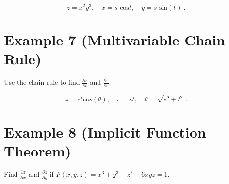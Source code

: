 \documentclass[11pt]{article}
\begin{document}
$$z = x^2y^3,\quad x = s \text{ cos} t, \quad y = s \text{ sin} (t)\;.$$

\section*{Example 7 (Multivariable Chain Rule)}

Use the chain rule to find $\frac{\partial z}{\partial t}$ and $\frac{\partial z}{\partial s}$.

$$z = e^r\text{cos}(\theta),\quad r = st, \quad \theta = \sqrt{s^2 + t^2}\;.$$

\section*{Example 8 (Implicit Function Theorem)}

Find $\frac{\partial z}{\partial x}$ and $\frac{\partial z}{\partial y}$ if $F(x,y,z) = x^3 + y^3 + z^3 + 6xyz = 1$.
\end{document}
